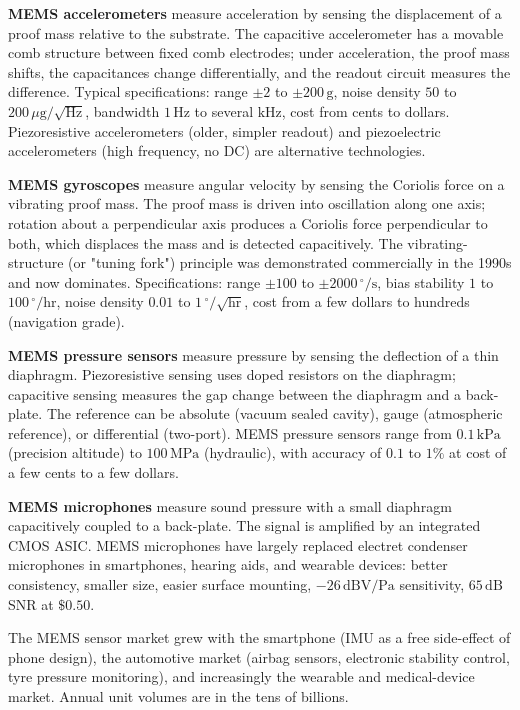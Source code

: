 \textbf{MEMS accelerometers} measure acceleration by sensing the displacement of a proof mass relative to the substrate. The capacitive accelerometer has a movable comb structure between fixed comb electrodes; under acceleration, the proof mass shifts, the capacitances change differentially, and the readout circuit measures the difference. Typical specifications: range $\pm 2$ to $\pm 200\,\text{g}$, noise density $50$ to $200\,\mu\text{g}/\sqrt{\text{Hz}}$, bandwidth $1\,\text{Hz}$ to several $\text{kHz}$, cost from cents to dollars. Piezoresistive accelerometers (older, simpler readout) and piezoelectric accelerometers (high frequency, no DC) are alternative technologies.

\textbf{MEMS gyroscopes} measure angular velocity by sensing the Coriolis force on a vibrating proof mass. The proof mass is driven into oscillation along one axis; rotation about a perpendicular axis produces a Coriolis force perpendicular to both, which displaces the mass and is detected capacitively. The vibrating-structure (or "tuning fork") principle was demonstrated commercially in the 1990s and now dominates. Specifications: range $\pm 100$ to $\pm 2000\,^\circ/\text{s}$, bias stability $1$ to $100\,^\circ/\text{hr}$, noise density $0.01$ to $1\,^\circ/\sqrt{\text{hr}}$, cost from a few dollars to hundreds (navigation grade).

\textbf{MEMS pressure sensors} measure pressure by sensing the deflection of a thin diaphragm. Piezoresistive sensing uses doped resistors on the diaphragm; capacitive sensing measures the gap change between the diaphragm and a back-plate. The reference can be absolute (vacuum sealed cavity), gauge (atmospheric reference), or differential (two-port). MEMS pressure sensors range from $0.1\,\text{kPa}$ (precision altitude) to $100\,\text{MPa}$ (hydraulic), with accuracy of $0.1$ to $1\%$ at cost of a few cents to a few dollars.

\textbf{MEMS microphones} measure sound pressure with a small diaphragm capacitively coupled to a back-plate. The signal is amplified by an integrated CMOS ASIC. MEMS microphones have largely replaced electret condenser microphones in smartphones, hearing aids, and wearable devices: better consistency, smaller size, easier surface mounting, $-26\,\text{dBV/Pa}$ sensitivity, $65\,\text{dB}$ SNR at $\$0.50$.

The MEMS sensor market grew with the smartphone (IMU as a free side-effect of phone design), the automotive market (airbag sensors, electronic stability control, tyre pressure monitoring), and increasingly the wearable and medical-device market. Annual unit volumes are in the tens of billions.

